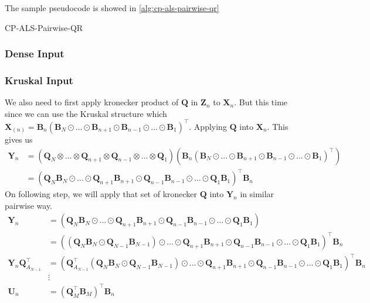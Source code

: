 \documentclass{article}
\newcommand{\mat}[1]{\mathbf{#1}}
\begin{document}
The sample pseudocode is showed in \cref{alg:cp-als-pairwise-qr}
\begin{algorithm}
  \caption{CP-ALS-Pairwise-QR}
  \label{alg:cp-als-pairwise-qr}
  
\end{algorithm}
\subsubsection{Dense Input}

\subsubsection{Kruskal Input}
We also need to first apply kronecker product of $\mat{Q}$ in $\mat{Z}_n$ to $\mat{X}_n$. But this time since we 
can use the Kruskal structure which $\mat{X}_{(n)} = \mat{B}_{n}(\mat{B}_{N} \odot \dots \odot \mat{B}_{n+1} \odot \mat{B}_{n-1}  \odot \dots \odot \mat{B}_{1})^\top$. Applying $\mat{Q}$ into 
$\mat{X}_n$. This gives us
\begin{align}
  \mat{Y}_n &= (\mat{Q}_N \otimes \dots \otimes \mat{Q}_{n+1} \otimes \mat{Q}_{n-1} \otimes \dots \otimes \mat{Q}_1)(\mat{B}_{n}(\mat{B}_{N} \odot \dots \odot \mat{B}_{n+1} \odot \mat{B}_{n-1}  \odot \dots \odot \mat{B}_{1})^\top) \nonumber \\
  &= (\mat{Q}_N\mat{B}_N \odot \dots \odot \mat{Q}_{n+1} \mat{B}_{n+1} \odot \mat{Q}_{n-1}\mat{B}_{n-1} \odot \dots \odot \mat{Q}_{1}\mat{B}_{1})^\top\mat{B}_n \nonumber   
\end{align}
On following step, we will apply that set of kronecker $\mat{Q}$ into $\mat{Y}_n$ in similar pairwise way.
\begin{align}
  \mat{Y}_n   &= (\mat{Q}_N\mat{B}_N \odot \dots \odot \mat{Q}_{n+1} \mat{B}_{n+1} \odot \mat{Q}_{n-1}\mat{B}_{n-1} \odot \dots \odot \mat{Q}_{1}\mat{B}_{1}) \nonumber   \\
      &= ((\mat{Q}_N\mat{B}_N \odot \mat{Q}_{N-1}\mat{B}_{N-1}) \odot \dots \odot \mat{Q}_{n+1} \mat{B}_{n+1} \odot \mat{Q}_{n-1}\mat{B}_{n-1} \odot \dots \odot \mat{Q}_{1}\mat{B}_{1})^\top\mat{B}_n \nonumber      \\
      \mat{Y}_n\mat{Q}_{A_{N-1}}^\top  &= (\mat{Q}_{A_{N-1}}^\top(\mat{Q}_N\mat{B}_N \odot \mat{Q}_{N-1}\mat{B}_{N-1}) \odot \dots \odot \mat{Q}_{n+1} \mat{B}_{n+1} \odot \mat{Q}_{n-1}\mat{B}_{n-1} \odot \dots \odot \mat{Q}_{1}\mat{B}_{1})^\top\mat{B}_n \nonumber \\
      & \vdots \nonumber \\
    \mat{U}_n  &= (\mat{Q}_{M}^\top\mat{B}_M)^\top\mat{B}_n \nonumber  
\end{align}
\end{document}
